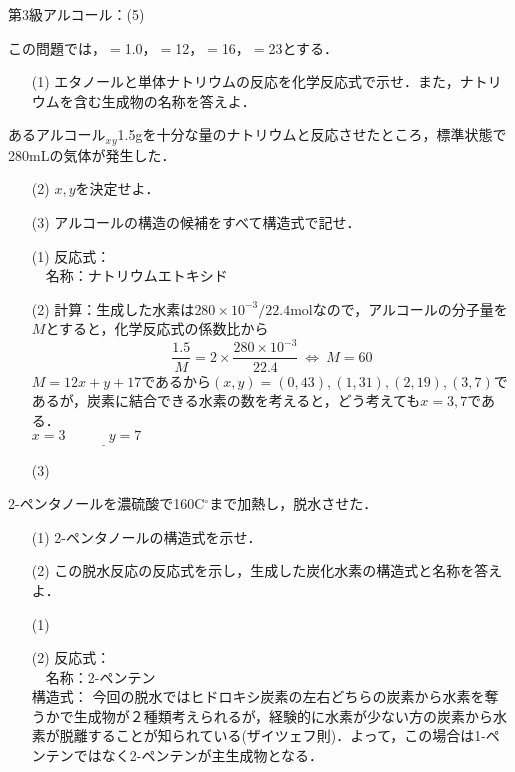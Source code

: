 \documentclass[a4paper,12pt]{ltjsreport}
\begin{document}
    \noindent 第3級アルコール：(5)\newpage
    \begin{que}
        この問題では，$=$1.0，$=$12，$=$16，$=$23とする．
    \begin{itemize}
        \item [(1)]エタノールと単体ナトリウムの反応を化学反応式で示せ．また，ナトリウムを含む生成物の名称を答えよ．
    \end{itemize}
            あるアルコール$_{x}$$_{y}$1.5gを十分な量のナトリウムと反応させたところ，標準状態で280mLの気体が発生した．
            \begin{itemize}
                \item [(2)]$x,y$を決定せよ．
                \item [(3)]アルコールの構造の候補をすべて構造式で記せ．
            \end{itemize}
    \end{que}
    \ans
    \begin{itemize}
        \item [(1)]反応式：\\[15pt]
        　名称：ナトリウムエトキシド\\[10pt]
        \item[(2)]計算：生成した水素は$280\times 10^{-3}/22.4$molなので，アルコールの分子量を$M$とすると，化学反応式の係数比から
        \[\frac{1.5}{M}=2\times\frac{280\times 10^{-3}}{22.4}~\Longleftrightarrow~M=60\]
        $M=12x+y+17$であるから$(x,y)=(0,43),(1,31),(2,19),(3,7)$であるが，炭素に結合できる水素の数を考えると，どう考えても$x=3,7$である．\\[10pt]$　　　　　　　　　　　　　　　　　　　　　　　　\underline{x=3~~~~~~~~~~~~~~y=7~~~~~~~~~~~}$\\[10pt]
        \item[(3)] 　　　　　　
    \end{itemize}
    \newpage
    \begin{que}
      2-ペンタノールを濃硫酸で160C$^\circ$まで加熱し，脱水させた．
      \begin{itemize}
        \item [(1)]2-ペンタノールの構造式を示せ．
        \item [(2)]この脱水反応の反応式を示し，生成した炭化水素の構造式と名称を答えよ．
      \end{itemize}
    \end{que}
    \ans
    \begin{itemize}
        \item [(1)]　\\[70pt]
        \item [(2)]反応式：\\[30pt]
        　名称：2-ペンテン\\[30pt]
        構造式：
        今回の脱水ではヒドロキシ炭素の左右どちらの炭素から水素を奪うかで生成物が２種類考えられるが，経験的に水素が少ない方の炭素から水素が脱離することが知られている(ザイツェフ則)．よって，この場合は1-ペンテンではなく2-ペンテンが主生成物となる．
    \end{itemize}
\end{document}
